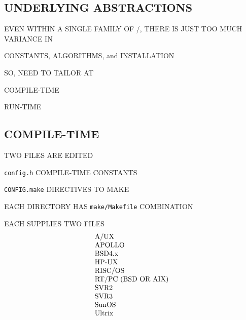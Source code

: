 \begin{bwslide}
\part	{UNDERLYING ABSTRACTIONS}\bf

\begin{nrtc}
\item	EVEN WITHIN A SINGLE FAMILY OF \unix/,
	THERE IS JUST TOO MUCH VARIANCE IN
    \begin{nrtc}
    \item	CONSTANTS, ALGORITHMS, and INSTALLATION
    \end{nrtc}

\item	SO, NEED TO TAILOR AT
    \begin{nrtc}
    \item	COMPILE-TIME

    \item	RUN-TIME
    \end{nrtc}
\end{nrtc}
\end{bwslide}


\begin{bwslide}
\part*	{COMPILE-TIME}\bf

\begin{nrtc}
\item	TWO FILES ARE EDITED

\item	\verb"config.h" COMPILE-TIME CONSTANTS

\item	\verb"CONFIG.make" DIRECTIVES TO MAKE

\item	EACH DIRECTORY HAS \verb"make/Makefile" COMBINATION
\end{nrtc}
\end{bwslide}


\begin{bwslide}

\begin{nrtc}
\item	EACH SUPPLIES TWO FILES
\[\begin{tabular}{l}
A/UX\\
APOLLO\\
BSD4.x\\
HP-UX\\
RISC/OS\\
RT/PC (BSD OR AIX)\\
SVR2\\
SVR3\\
SunOS\\
Ultrix
\end{tabular}\]
\end{nrtc}
\end{bwslide}

